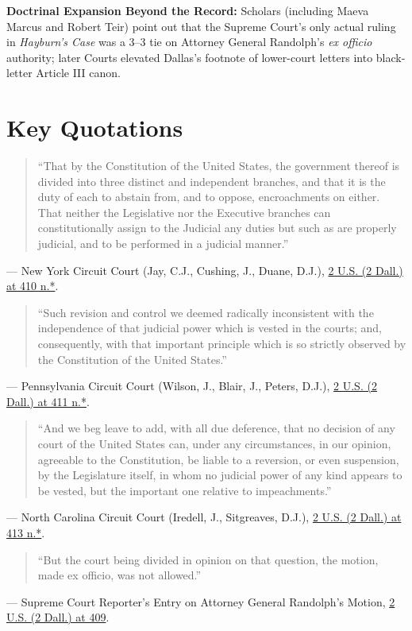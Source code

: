 \documentclass[12pt]{article}
\begin{document}
\textbf{Doctrinal Expansion Beyond the Record:} Scholars (including Maeva Marcus and Robert Teir) point out that the Supreme Court's only actual ruling in \textit{Hayburn's Case} was a 3--3 tie on Attorney General Randolph's \textit{ex officio} authority; later Courts elevated Dallas's footnote of lower-court letters into black-letter Article III canon.

\section{Key Quotations}
\begin{quote}
``That by the Constitution of the United States, the government thereof is divided into three distinct and independent branches, and that it is the duty of each to abstain from, and to oppose, encroachments on either. That neither the Legislative nor the Executive branches can constitutionally assign to the Judicial any duties but such as are properly judicial, and to be performed in a judicial manner.''
\end{quote}
\noindent --- New York Circuit Court (Jay, C.J., Cushing, J., Duane, D.J.), \href{https://supreme.justia.com/cases/federal/us/2/409/}{2 U.S. (2 Dall.) at 410 n.*}.

\begin{quote}
``Such revision and control we deemed radically inconsistent with the independence of that judicial power which is vested in the courts; and, consequently, with that important principle which is so strictly observed by the Constitution of the United States.''
\end{quote}
\noindent --- Pennsylvania Circuit Court (Wilson, J., Blair, J., Peters, D.J.), \href{https://www.law.cornell.edu/constitution-conan/article-3/section-2/clause-1/advisory-opinion-doctrine-and-practice}{2 U.S. (2 Dall.) at 411 n.*}.

\begin{quote}
``And we beg leave to add, with all due deference, that no decision of any court of the United States can, under any circumstances, in our opinion, agreeable to the Constitution, be liable to a reversion, or even suspension, by the Legislature itself, in whom no judicial power of any kind appears to be vested, but the important one relative to impeachments.''
\end{quote}
\noindent --- North Carolina Circuit Court (Iredell, J., Sitgreaves, D.J.), \href{https://supreme.justia.com/cases/federal/us/2/409/}{2 U.S. (2 Dall.) at 413 n.*}.

\begin{quote}
``But the court being divided in opinion on that question, the motion, made ex officio, was not allowed.''
\end{quote}
\noindent --- Supreme Court Reporter's Entry on Attorney General Randolph's Motion, \href{https://supreme.justia.com/cases/federal/us/2/409/}{2 U.S. (2 Dall.) at 409}.
\end{document}
